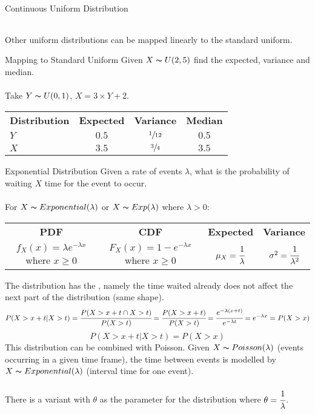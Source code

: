 \begin{definitionbox}{Continuous Uniform Distribution}
\begin{center}
\begin{tabular}{c | c | c | c}
		\end{tabular}
	\end{center}
	Other uniform distributions can be mapped linearly to the standard uniform.
	\begin{examplebox}{Mapping to Standard Uniform}
		Given $X \thicksim U(2,5)$ find the expected, variance and median.
		\\
		\\ Take $Y \thicksim U(0,1)$, $X = 3 \times Y + 2$.
		\begin{center}
			\begin{tabular}{l c c c}
				\textbf{Distribution} & \textbf{Expected} & \textbf{Variance} & \textbf{Median} \\
				$Y$                   & $0.5$             & $\sfrac{1}{12}$   & $0.5$           \\
				$X$                   & $3.5$             & $\sfrac{3}{4}$    & $3.5$           \\
			\end{tabular}
		\end{center}
	\end{examplebox}
\end{definitionbox}
\begin{definitionbox}{Exponential Distribution}
	Given a rate of events $\lambda$, what is the probability of waiting $X$ time for the event to occur.
	\\
	\\ For $X \thicksim Exponential(\lambda)$ or $X \thicksim Exp(\lambda)$ where $\lambda > 0$:
	\begin{center}
		\begin{tabular}{c | c | c | c}
			\textbf{PDF}                                        & \textbf{CDF}                                    & \textbf{Expected}            & \textbf{Variance}                 \\
			$f_X(x) = \lambda e^{- \lambda x}$ where $x \geq 0$ & $F_X(x) = 1 - e^{- \lambda x}$ where $x \geq 0$ & $\mu_X = \cfrac{1}{\lambda}$ & $\sigma^2 = \cfrac{1}{\lambda^2}$ \\
		\end{tabular}
	\end{center}
	The distribution has the , namely the time waited already does not affect the next part of the distribution (same shape).
	\[P(X > x + t | X > t) = \cfrac{P(X > x + t \cap X > t)}{P(X > t)} = \cfrac{P(X > x + t)}{P(X > t)} = \cfrac{e^{-\lambda(x+t)}}{e^{-\lambda t}} = e^{-\lambda x} = P(X > x)\]
	\[P(X > x + t | X > t) =  P(X > x)\]
	This distribution can be combined with Poisson. Given $X \thicksim Poisson(\lambda)$ (events occurring in a given time frame), the time between events is modelled by $X \thicksim Exponential(\lambda)$ (interval time for one event).
	\\
	\\ There is a variant with $\theta$ as the parameter for the distribution where $\theta = \cfrac{1}{\lambda}$.
\end{definitionbox}
